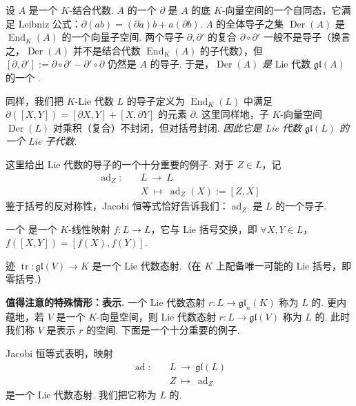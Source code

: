 \begin{numpara}[代数的导子]\label{np:lie-1-4-3}
设 $A$ 是一个 $K$-结合代数. $A$ 的一个  $\partial$ 是 $A$ 的底 $K$-向量空间的一个自同态，它满足 Leibniz 公式：$\partial(ab)=(\partial a)b+a(\partial b)$. $A$ 的全体导子之集 $\operatorname{Der}(A)$ 是 $\operatorname{End}_K(A)$ 的一个向量子空间. 两个导子 $\partial,\partial'$ 的复合 $\partial\circ\partial'$ 一般不是导子（换言之，$\operatorname{Der}(A)$ 并不是结合代数 $\operatorname{End}_K(A)$ 的子代数），但 $[\partial,\partial']:=\partial\circ\partial'-\partial'\circ\partial$ 仍然是 $A$ 的导子. 于是，$\operatorname{Der}(A)$ \emph{是} Lie 代数 $\mathfrak{gl}(A)$ 的一个 .

同样，我们把 $K$-Lie 代数 $L$ 的导子定义为 $\operatorname{End}_K(L)$ 中满足 $\partial([X,Y])=[\partial X,Y]+[X,\partial Y]$ 的元素 $\partial$. 这里同样地，子 $K$-向量空间 $\operatorname{Der}(L)$ 对乘积（复合）不封闭，但对括号封闭. \emph{因此它是 Lie 代数 $\mathfrak{gl}(L)$ 的一个 Lie 子代数}.
\end{numpara}

\begin{example*}
这里给出 Lie 代数的导子的一个十分重要的例子. 对于 $Z\in L$，记
\[
\begin{aligned}
\operatorname{ad}_Z:\quad &L\ \longrightarrow\ L\\
&X\ \longmapsto\ \operatorname{ad}_Z(X):=[Z,X]
\end{aligned}
\]
鉴于括号的反对称性，Jacobi 恒等式恰好告诉我们：$\operatorname{ad}_Z$ 是 $L$ 的一个导子.
\end{example*}

\begin{definition}\label{def:lie-1-4-4}
一个 是一个 $K$-线性映射 $f:L\longrightarrow L$，它与 Lie 括号交换，即 $\forall X,Y\in L$，$f([X,Y])=[f(X),f(Y)]$.
\end{definition}

\begin{example*}
迹 $\operatorname{tr}:\mathfrak{gl}(V)\longrightarrow K$ 是一个 Lie 代数态射.（在 $K$ 上配备唯一可能的 Lie 括号，即零括号.）
\end{example*}

\noindent\textbf{值得注意的特殊情形：表示.} 一个 Lie 代数态射 $r:L\longrightarrow\mathfrak{gl}_n(K)$ 称为 $L$ 的. 更内蕴地，若 $V$ 是一个 $K$-向量空间，则 Lie 代数态射 $r:L\longrightarrow\mathfrak{gl}(V)$ 称为 $L$ 的. 此时我们称 $V$ 是表示 $r$ 的空间. 下面是一个十分重要的例子.

\begin{numpara}\label{np:lie-1-4-5}
Jacobi 恒等式表明，映射
\[
\begin{aligned}
\operatorname{ad}:\quad &L\ \longrightarrow\ \mathfrak{gl}(L)\\
&Z\ \longmapsto\ \operatorname{ad}_Z
\end{aligned}
\]
是一个 Lie 代数态射. 我们把它称为 $L$ 的.
\end{numpara}
